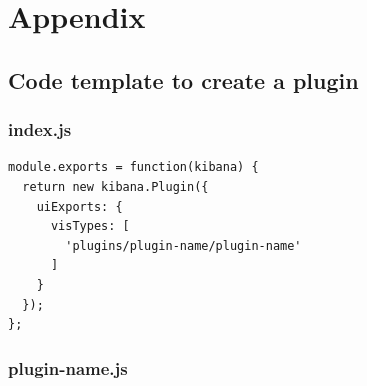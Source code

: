 \documentclass[a4paper, 12pt]{book}
\begin{document}
\cleardoublepage
\appendix
\chapter{Appendix}
\label{sec:appendix}
\section{Code template to create a plugin}

\subsection{index.js}
\label{sec:indexjs}

\begin{lstlisting}[frame=single]
module.exports = function(kibana) {
  return new kibana.Plugin({
    uiExports: {
      visTypes: [
        'plugins/plugin-name/plugin-name'
      ]
    }
  });
};
\end{lstlisting}

\subsection{plugin-name.js}
\label{sec:pluginnamejs}
\end{document}
